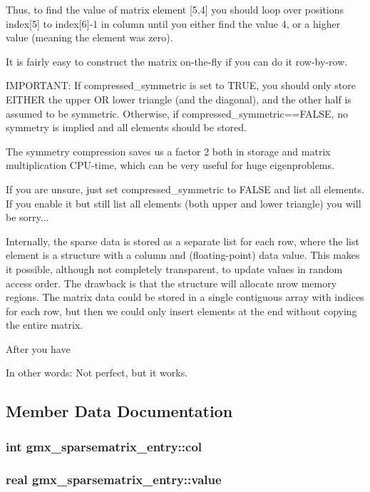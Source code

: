 \-Thus, to find the value of matrix element \mbox{[}5,4\mbox{]} you should loop over positions index\mbox{[}5\mbox{]} to index\mbox{[}6\mbox{]}-\/1 in column until you either find the value 4, or a higher value (meaning the element was zero).

\-It is fairly easy to construct the matrix on-\/the-\/fly if you can do it row-\/by-\/row.

\-I\-M\-P\-O\-R\-T\-A\-N\-T\-: \-If compressed\-\_\-symmetric is set to \-T\-R\-U\-E, you should only store \-E\-I\-T\-H\-E\-R the upper \-O\-R lower triangle (and the diagonal), and the other half is assumed to be symmetric. \-Otherwise, if compressed\-\_\-symmetric==\-F\-A\-L\-S\-E, no symmetry is implied and all elements should be stored.

\-The symmetry compression saves us a factor 2 both in storage and matrix multiplication \-C\-P\-U-\/time, which can be very useful for huge eigenproblems.

\-If you are unsure, just set compressed\-\_\-symmetric to \-F\-A\-L\-S\-E and list all elements. \-If you enable it but still list all elements (both upper and lower triangle) you will be sorry...

\-Internally, the sparse data is stored as a separate list for each row, where the list element is a structure with a column and (floating-\/point) data value. \-This makes it possible, although not completely transparent, to update values in random access order. \-The drawback is that the structure will allocate nrow memory regions. \-The matrix data could be stored in a single contiguous array with indices for each row, but then we could only insert elements at the end without copying the entire matrix.

\-After you have

\-In other words\-: \-Not perfect, but it works. 

\subsection{\-Member \-Data \-Documentation}
\hypertarget{structgmx__sparsematrix__entry_a99e6c89426f4795cf6e91d089eb5a457}{
\subsubsection[{col}]{\setlength{\rightskip}{0pt plus 5cm}int {\bf gmx\-\_\-sparsematrix\-\_\-entry\-::col}}}\label{structgmx__sparsematrix__entry_a99e6c89426f4795cf6e91d089eb5a457}
\hypertarget{structgmx__sparsematrix__entry_aa635a46c3f16f7e276c640f28136cdd2}{
\subsubsection[{value}]{\setlength{\rightskip}{0pt plus 5cm}real {\bf gmx\-\_\-sparsematrix\-\_\-entry\-::value}}}\label{structgmx__sparsematrix__entry_aa635a46c3f16f7e276c640f28136cdd2}


